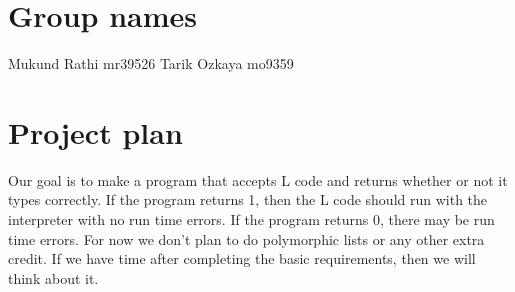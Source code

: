 \documentclass[10pt]{article}
\begin{document}
\section{Group names}
Mukund Rathi mr39526 \newline
Tarik Ozkaya mo9359

\section{Project plan}
Our goal is to make a program that accepts
L code and returns whether or not it types
correctly. If the program returns 1, then
the L code should run with the interpreter
with no run time errors. If the program 
returns 0, there may be run time errors. \newline
For now we don't plan to do polymorphic lists or any other extra credit. If we have time after completing the basic requirements, then we will think about it.
\end{document}
